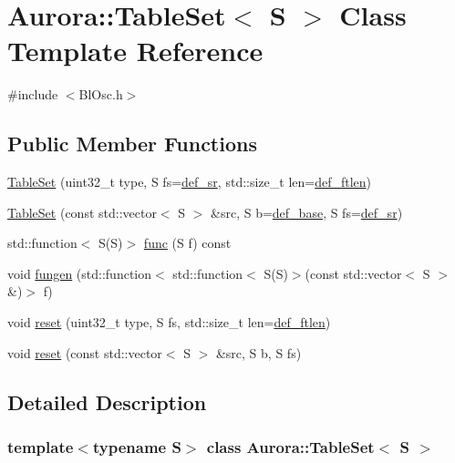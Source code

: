 \hypertarget{class_aurora_1_1_table_set}{}\section{Aurora\+:\+:Table\+Set$<$ S $>$ Class Template Reference}
\label{class_aurora_1_1_table_set}


{\ttfamily \#include $<$Bl\+Osc.\+h$>$}

\subsection*{Public Member Functions}
\begin{DoxyCompactItemize}
\item 
\hyperlink{class_aurora_1_1_table_set_a0be4528b972606335d73ac312da6337b}{Table\+Set} (uint32\+\_\+t type, S fs=\hyperlink{namespace_aurora_ad49263d809bea98dd422e95bc91bc03e}{def\+\_\+sr}, std\+::size\+\_\+t len=\hyperlink{namespace_aurora_a14dabfd9feedfa09c0e6f86d2627f006}{def\+\_\+ftlen})
\item 
\hyperlink{class_aurora_1_1_table_set_a884ecfde480fdac4c32fa10a82286941}{Table\+Set} (const std\+::vector$<$ S $>$ \&src, S b=\hyperlink{namespace_aurora_acb267dff62f74484893c2d5b679b78bf}{def\+\_\+base}, S fs=\hyperlink{namespace_aurora_ad49263d809bea98dd422e95bc91bc03e}{def\+\_\+sr})
\item 
std\+::function$<$ S(S)$>$ \hyperlink{class_aurora_1_1_table_set_a27a325a2c3c4b8cd50e0c86d6ac3c617}{func} (S f) const
\item 
void \hyperlink{class_aurora_1_1_table_set_acd30711601ff6c362253c5d0d9582390}{fungen} (std\+::function$<$ std\+::function$<$ S(S)$>$(const std\+::vector$<$ S $>$ \&)$>$ f)
\item 
void \hyperlink{class_aurora_1_1_table_set_ac2c945c49d53f60fd909dc771a6ff7e5}{reset} (uint32\+\_\+t type, S fs, std\+::size\+\_\+t len=\hyperlink{namespace_aurora_a14dabfd9feedfa09c0e6f86d2627f006}{def\+\_\+ftlen})
\item 
void \hyperlink{class_aurora_1_1_table_set_afec852dca45285ec57b6a4a97dffac36}{reset} (const std\+::vector$<$ S $>$ \&src, S b, S fs)
\end{DoxyCompactItemize}


\subsection{Detailed Description}
\subsubsection*{template$<$typename S$>$\newline
class Aurora\+::\+Table\+Set$<$ S $>$}


